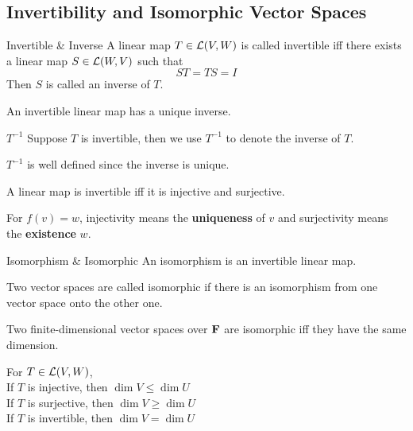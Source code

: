 \documentclass[12pt,a4paper]{article}
\begin{document}
    \subsection{Invertibility and Isomorphic Vector Spaces}
    \begin{defi}{Invertible \& Inverse}
        A linear map $T\in\mathcal{L}(V,W)$ is called invertible iff there exists a linear map $S\in\mathcal{L}(W,V)$ such that 
        $$ST=TS=I$$
        Then $S$ is called an inverse of $T$.
    \end{defi}
    \begin{prop}
        An invertible linear map has a unique inverse.
    \end{prop}
    \begin{notation}{$T^{-1}$}
        Suppose $T$ is invertible, then we use $T^{-1}$ to denote the inverse of $T$.
    \end{notation}
    \begin{remark}
        $T^{-1}$ is well defined since the inverse is unique.
    \end{remark}
    \hfill

    \begin{prop}
        A linear map is invertible iff it is injective and surjective.
    \end{prop}
    \begin{remark}
        For $f(v)=w$, injectivity means the \textbf{uniqueness} of $v$ and surjectivity means the \textbf{existence} $w$.
    \end{remark}
    \hfill

    \begin{defi}{Isomorphism \& Isomorphic}
        An isomorphism is an invertible linear map.

        Two vector spaces are called isomorphic if there is an isomorphism from one vector space onto the other one.
    \end{defi}
    \hfill

    \begin{prop}\label{3.37}
        Two finite-dimensional vector spaces over $\mathbf{F}$ are isomorphic iff they have the same dimension.
    \end{prop}
    \begin{remark}
        For $T\in\mathcal{L}(V,W)$,\\
        If $T$ is injective, then $\dim{V}\leq\dim{U}$\\
        If $T$ is surjective, then $\dim{V}\geq\dim{U}$\\
        If $T$ is invertible, then $\dim{V}=\dim{U}$
    \end{remark}
    \hfill
\end{document}
